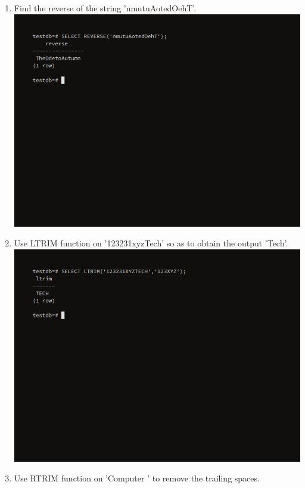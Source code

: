 \documentclass[10pt,a4paper,titlepage]{report}
\begin{document}
{\begin{enumerate}
	\item Find the reverse of the string 'nmutuAotedOehT'.\newline
	\includegraphics[width=\linewidth]{../Images/Strings/14.png}
	\item Use LTRIM function on '123231xyzTech' so as to obtain the output 'Tech'.\newline
	\includegraphics[width=\linewidth]{../Images/Strings/15.png}
	\item Use RTRIM function on 'Computer ' to remove the trailing spaces.\newline

\end{enumerate}}
\end{document}
